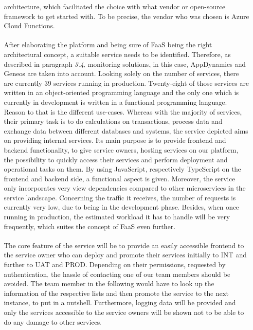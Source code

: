 \documentclass[a4paper,twoside,11pt, pagesize]{scrartcl}
\begin{document}
\begin{spacing}{1.2}
architecture, which facilitated the choice with what vendor or open-source framework to get started with. To be precise, the vendor who was chosen is Azure Cloud Functions.\\\\After elaborating the platform and being sure of FaaS being the right architectural concept, a suitable service needs to be identified. Therefore, as described in paragraph \textit{3.4}, monitoring solutions, in this case, AppDynamics and Geneos are taken into account. Looking solely on the number of services, there are currently 39 services running in production. Twenty-eight of those services are written in an object-oriented programming language and the only one which is currently in development is written in a functional programming language. Reason to that is the different use-cases. Whereas with the majority of services, their primary task is to do calculations on transactions, process data and exchange data between different databases and systems, the service depicted aims on providing internal services. Its main purpose is to provide frontend and backend functionality, to give service owners, hosting services on our platform, the possibility to quickly access their services and perform deployment and operational tasks on them. By using JavaScript, respectively TypeScript on the frontend and backend side, a functional aspect is given. Moreover, the service only incorporates very view dependencies compared to other microservices in the service landscape. Concerning the traffic it receives, the number of requests is currently very low, due to being in the development phase. Besides, when once running in production, the estimated workload it has to handle will be very frequently, which suites the concept of FaaS even further.\\\\The core feature of the service will be to provide an easily accessible frontend to the service owner who can deploy and promote their services initially to INT and further to UAT and PROD. Depending on their permissions, requested by authentication, the hassle of contacting one of our team members should be avoided. The team member in the following would have to look up the information of the respective lists and then promote the service to the next instance, to put in a nutshell. Furthermore, logging data will be provided and only the services accessible to the service owners will be shown not to be able to do any damage to other services.\\ 

\end{spacing}
\end{document}
